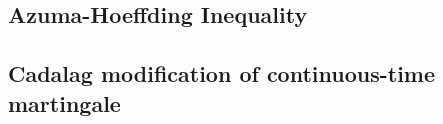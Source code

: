 \subsection{Azuma-Hoeffding Inequality}

\subsection{Cadalag modification of continuous-time martingale}


